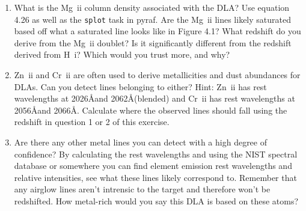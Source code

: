 \begin{enumerate}
	\item What is the Mg~{\sc ii} column density associated with the DLA? Use equation 4.26 as well as the \texttt{splot} task in pyraf. Are the Mg~{\sc ii} lines likely 
		saturated based off what a saturated line looks like in Figure 4.1? What redshift do you derive from the Mg~{\sc ii} doublet? Is it significantly different from
		the redshift derived from H~{\sc i}? Which would you trust more, and why?
	\item Zn~{\sc ii} and Cr~{\sc ii} are often used to derive metallicities and dust abundances for DLAs. Can
		you detect lines belonging to either? Hint: Zn~{\sc ii} has rest wavelengths at 2026\AA and 2062\AA(blended) and Cr~{\sc ii} has rest wavelengths at 2056\AA and 2066\AA. Calculate where the observed lines should fall using the redshift in question 1 or 2 of this exercise.
         \item Are there any other metal lines you can detect with a high degree of confidence? By calculating the rest wavelengths and using the NIST spectral database or somewhere you can find element emission rest wavelengths and relative intensities, see what these lines likely correspond to. Remember that any airglow lines aren't intrensic to the target and therefore won't be redshifted. How metal-rich would you say this DLA is based on these atoms?
\end{enumerate}